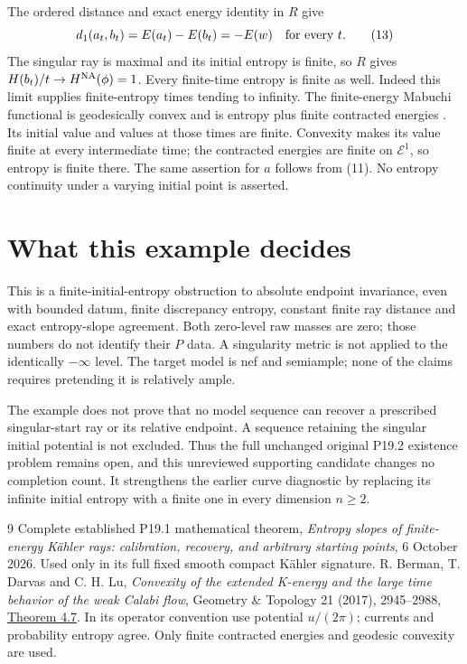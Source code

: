 \documentclass[10pt]{article}
\begin{document}
The ordered distance and exact energy identity in $R$ give
\[
 d_1(a_t,b_t)=E(a_t)-E(b_t)=-E(w)\quad\hbox{for every }t.          \tag{13}
\]
The singular ray is maximal and its initial entropy is finite, so
$R$ gives $H(b_t)/t\to H^{\rm NA}(\phi)=1$.
Every finite-time entropy is finite as well. Indeed this limit
supplies finite-entropy times tending to infinity. The finite-energy
Mabuchi functional is geodesically convex and is entropy plus
finite contracted energies \cite{BDL}. Its initial value and values
at those times are finite. Convexity makes its value finite at every
intermediate time; the contracted energies are finite on $\mathcal E^1$,
so entropy is finite there. The same assertion for $a$ follows from
(11). No entropy continuity under a varying initial point is asserted.

\section{What this example decides}
This is a finite-initial-entropy obstruction to absolute endpoint
invariance, even with bounded datum, finite discrepancy entropy,
constant finite ray distance and exact entropy-slope agreement.
Both zero-level raw masses are zero; those numbers do not identify
their $P$ data. A singularity metric is not applied to the identically
$-\infty$ level. The target model is nef and semiample; none of the
claims requires pretending it is relatively ample.

The example does not prove that no model sequence can recover a
prescribed singular-start ray or its relative endpoint. A sequence
retaining the singular initial potential is not excluded. Thus the
full unchanged original P19.2 existence problem remains open, and
this unreviewed supporting candidate changes no completion count.
It strengthens the earlier curve diagnostic by replacing its
infinite initial entropy with a finite one in every dimension $n\geq2$.

\begin{thebibliography}{9}
 Complete established P19.1 mathematical theorem,
\emph{Entropy slopes of finite-energy K\"ahler rays: calibration,
recovery, and arbitrary starting points}, 6 October 2026.
Used only in its full fixed smooth compact K\"ahler signature.
 R. Berman, T. Darvas and C. H. Lu,
\emph{Convexity of the extended K-energy and the large time behavior
of the weak Calabi flow}, Geometry \& Topology 21 (2017), 2945--2988,
\href{https://msp.org/gt/2017/21-5/gt-v21-n5-p08-s.pdf}{Theorem 4.7}.
In its operator convention use potential $u/(2\pi)$; currents and
probability entropy agree. Only finite contracted energies and
geodesic convexity are used.
\end{thebibliography}
\end{document}
